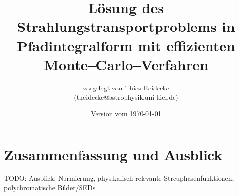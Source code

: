 \documentclass[
	12pt,
	a4paper,
	DIV=calc,
	titlepage,
	twoside,
	listof=totoc,
	bibliography=totocnumbered,
	final%
]{scrbook}
\begin{document}
\frontmatter
	\titlehead{Christian--Albrechts--Universität zu Kiel\\ Institut für Theoretische Physik und Astrophysik}
	\subject{Diplomarbeit}
	\title{Lösung des Strahlungstransportproblems in Pfadintegralform mit effizienten Monte--Carlo--Verfahren}
	\author{vorgelegt von Thies Heidecke\\(theidecke@astrophysik.uni-kiel.de)}
	\publishers{betreut durch Prof. Dr. Sebastian Wolf}
	\date{Version vom \today}
	\maketitle

	\tableofcontents	%

	\newcommand{\location}[1]{\mathbf{#1}}
	\newcommand{\scatter}[1]{\overset{#1}{\leftrightsquigarrow}}
	\newcommand{\normalized}[1]{\frac{#1}{||#1||}}
	\newcommand{\pirate}{\texttt{PIRaTE} }
	\newcommand{\mctd}{\texttt{MC3D} }

\mainmatter
	
	
	
	
	
	
		
	
	\chapter{Zusammenfassung und Ausblick}
	TODO: Ausblick: Normierung, physikalisch relevante Streuphasenfunktionen, polychromatische Bilder/SEDs

\backmatter
	\mdqoff
	
	
	\mdqon
\end{document}
